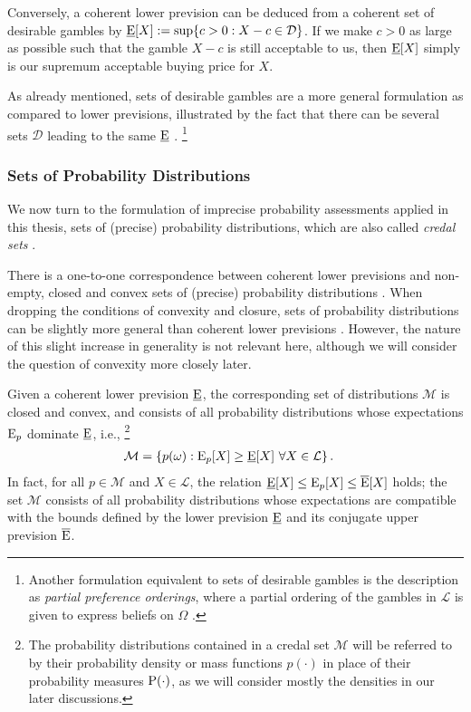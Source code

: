 Conversely, a coherent lower prevision can be deduced from a coherent set of desirable gambles by
$\underline{\operatorname{E}}[X] := \sup\{c > 0 : X - c \in \mathcal{D}\}$.
If we make $c > 0$ as large as possible such that the gamble $X-c$ is still acceptable to us,
then $\underline{\operatorname{E}}[X]$ simply is our supremum acceptable buying price for $X$.

As already mentioned, sets of desirable gambles are a more general formulation
as compared to lower previsions, illustrated by the fact that there can be
several sets $\mathcal{D}$ leading to the same $\underline{\operatorname{E}}$ \parencite[p.~139]{2000:walley::towards}.%
\footnote{Another formulation equivalent to sets of desirable gambles is the description as \emph{partial preference orderings},
where a partial ordering of the gambles in $\mathcal{L}$ is given to express beliefs on $\Omega$
\parencite[p.~138]{2000:walley::towards}.}

\subsubsection{Sets of Probability Distributions}

We now turn to the formulation of imprecise probability assessments
applied in this thesis, 
sets of (precise) probability distributions,
which are also called \emph{credal sets} \parencite[e.g.,][p.~136]{2000:walley::towards}.

There is a one-to-one correspondence between coherent lower previsions
and non-empty, closed and convex sets of (precise) probability distributions
\parencite[\S 3.6.1]{1991:walley}.
When dropping the conditions of convexity and closure,
sets of probability distributions can be slightly more general
than coherent lower previsions \parencite[\S 5]{2000:walley::towards}.
However, the nature of this slight increase in generality is not relevant here,
although we will consider the question of convexity more closely later.

Given a coherent lower prevision $\underline{\operatorname{E}}$,
the corresponding set of distributions $\mathcal{M}$
is closed and convex, and consists of all probability distributions
whose expectations $\operatorname{E}_p$ dominate $\underline{\operatorname{E}}$, i.e.,%
\footnote{The probability distributions contained in a credal set $\mathcal{M}$
will be referred to by their probability density or mass functions $p(\cdot)$
in place of their probability measures $\operatorname{P}(\cdot)$, as we will consider mostly the densities
in our later discussions.}
\begin{align*}
\mathcal{M} &= \{ p(\omega) : \operatorname{E}_p[X] \ge \underline{\operatorname{E}}[X]\ \forall X \in \mathcal{L}\}\,.
\end{align*}
In fact, for all $p \in \mathcal{M}$ and $X \in \mathcal{L}$,
the relation $\underline{\operatorname{E}}[X] \le \operatorname{E}_p[X] \le \overline{\operatorname{E}}[X]$ holds;
the set $\mathcal{M}$ consists of all probability distributions
whose expectations are compatible with the bounds defined by
the lower prevision $\underline{\operatorname{E}}$ and its conjugate upper prevision $\overline{\operatorname{E}}$.

